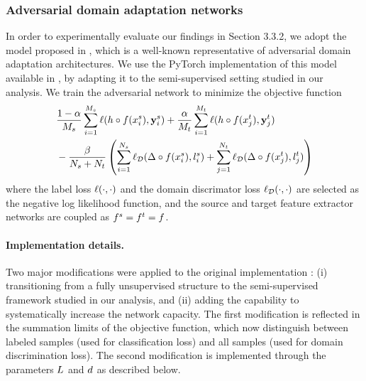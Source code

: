 \documentclass[review,supplement,onefignum,onetabnum]{siamonline250211}
\begin{document}
\subsubsection{Adversarial domain adaptation networks}

In order to experimentally evaluate our findings in Section 3.3.2, we adopt the model proposed in \cite{GaninUAGLLML16}, which is a well-known representative of adversarial domain adaptation architectures. We use the PyTorch implementation of this model available in \cite{fungtion_DANN_py3}, by adapting it to the semi-supervised setting studied in our analysis. We train the adversarial network to minimize the objective function
%
%
\begin{equation*}
\begin{split}
&  \frac{1-\alpha}{M_s} \sum_{i=1}^{M_s}  \ell( h \circ f(x^s_i), \mathbf{y}^s_i )  
+ \frac{\alpha}{M_t} \sum_{i=1}^{M_t} \ell( h \circ f(x^t_j),  \mathbf{y}^t_j  ) \\
& - 
\frac{\beta}{N_s + N_t}
\left(
 \sum_{i=1}^{N_s}  \ell_{\mathcal{D}}( \Delta \circ f(x^s_i), l^s_i )
 +
  \sum_{j=1}^{N_t} \ell_{\mathcal{D}}( \Delta \circ f(x^t_j), l^t_j  ) 
  \right)
  \end{split}
\end{equation*}
%
where the label loss $\ell(\cdot, \cdot)$ and the domain discrimator loss $\ell_{\mathcal{D}}(\cdot, \cdot)$ are selected as the negative log likelihood function, and the source and target feature extractor networks are coupled as $f^s=f^t=f$. 

\paragraph{Implementation details.}
Two major modifications were applied to the original implementation \cite{fungtion_DANN_py3}: (i) transitioning from a fully unsupervised structure to the semi-supervised framework studied in our analysis, and (ii) adding the capability to systematically increase the network capacity. The first modification is reflected in the summation limits of the objective function, which now distinguish between labeled samples (used for classification loss) and all samples (used for domain discrimination loss). The second modification is implemented through the parameters $L$ and ${d}$ as described below.
\end{document}
